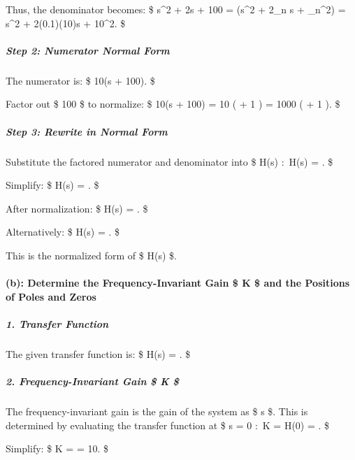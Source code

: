 \documentclass[11pt]{article}
\begin{document}
Thus, the denominator becomes: \$ s\^{}2 + 2s + 100 = (s\^{}2 +
2\zeta\omega\_n s + \omega\_n\^{}2) = s\^{}2 + 2(0.1)(10)s + 10\^{}2. \$

\subparagraph{Step 2: Numerator Normal
Form}\label{step-2-numerator-normal-form}

The numerator is: \$ 10(s + 100). \$

Factor out \$ 100 \$ to normalize: \$ 10(s + 100) = 10  \left(
 + 1 \right) = 1000 \left(  + 1 \right). \$

\subparagraph{Step 3: Rewrite in Normal
Form}\label{step-3-rewrite-in-normal-form}

Substitute the factored numerator and denominator into \$ H(s) \(:\)
H(s) =
.
\$

Simplify: \$ H(s) = 
\cdot {}.
\$

After normalization: \$ H(s) =
.
\$

Alternatively: \$ H(s) =
.
\$

This is the normalized form of \$ H(s) \$.

    \paragraph{(b): Determine the Frequency-Invariant Gain \$ K \$ and the
Positions of Poles and
Zeros}\label{b-determine-the-frequency-invariant-gain-k-and-the-positions-of-poles-and-zeros}

\subparagraph{\texorpdfstring{1. \textbf{Transfer
Function}}{1. Transfer Function}}\label{transfer-function}

The given transfer function is: \$ H(s) =
. \$

\subparagraph{\texorpdfstring{2. \textbf{Frequency-Invariant Gain \$ K
\$}}{2. Frequency-Invariant Gain \$ K \$}}\label{frequency-invariant-gain-k}

The frequency-invariant gain is the gain of the system as \$ s  \$.
This is determined by evaluating the transfer function at \$ s = 0 \(:\)
K = H(0) = . \$

Simplify: \$ K =  = 10. \$
\end{document}
